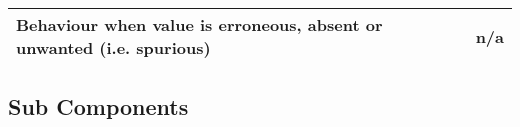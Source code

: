 \begin{longtable}{p{}p{}}
 \\
\midrule
Behaviour when value is erroneous, absent or unwanted (i.e. spurious) & n/a \\
\bottomrule
\end{longtable}


\subsection{Sub Components}

%